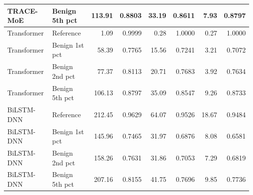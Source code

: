 \begin{table}[!htbp]
{\begin{tabular}{llrrrrrr}
TRACE-MoE & Benign 5th pct & 113.91 & 0.8803 & 33.19 & 0.8611 & 7.93 & 0.8797 \\
\midrule
Transformer & Reference & 1.09 & 0.9999 & 0.28 & 1.0000 & 0.27 & 1.0000 \\
Transformer & Benign 1st pct & 58.39 & 0.7765 & 15.56 & 0.7241 & 3.21 & 0.7072 \\
Transformer & Benign 2nd pct & 77.37 & 0.8113 & 20.71 & 0.7683 & 3.92 & 0.7634 \\
Transformer & Benign 5th pct & 106.13 & 0.8797 & 35.09 & 0.8547 & 9.26 & 0.8733 \\
\midrule
BiLSTM-DNN & Reference & 212.45 & 0.9629 & 64.07 & 0.9526 & 18.67 & 0.9484 \\
BiLSTM-DNN & Benign 1st pct & 145.96 & 0.7465 & 31.97 & 0.6876 & 8.08 & 0.6581 \\
BiLSTM-DNN & Benign 2nd pct & 158.26 & 0.7631 & 31.86 & 0.7053 & 7.29 & 0.6819 \\
BiLSTM-DNN & Benign 5th pct & 207.16 & 0.8155 & 41.75 & 0.7696 & 9.85 & 0.7736 \\
\bottomrule
\end{tabular}
}
\end{table}
